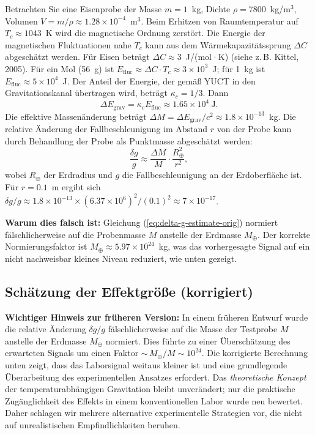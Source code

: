 \documentclass[12pt]{article}
\theoremstyle{remark}
\begin{document}
	Betrachten Sie eine Eisenprobe der Masse $m = 1$~kg, Dichte $\rho = 7800$~kg/m$^3$, Volumen $V = m/\rho \approx 1.28\times10^{-4}$~m$^3$. Beim Erhitzen von Raumtemperatur auf $T_c \approx 1043$~K wird die magnetische Ordnung zerstört. Die Energie der magnetischen Fluktuationen nahe $T_c$ kann aus dem Wärmekapazitätssprung $\Delta C$ abgeschätzt werden. Für Eisen beträgt $\Delta C \approx 3$~J/(mol·K) (siehe z. B. Kittel, 2005). Für ein Mol (56~g) ist $E_{\text{fluc}} \approx \Delta C \cdot T_c \approx 3\times10^3$~J; für 1~kg ist $E_{\text{fluc}} \approx 5\times10^4$~J. Der Anteil der Energie, der gemäß YUCT in den Gravitationskanal übertragen wird, beträgt $\kappa_c = 1/3$. Dann
	\begin{equation}
		\Delta E_{\text{grav}} = \kappa_c E_{\text{fluc}} \approx 1.65\times10^4\ \text{J}.
	\end{equation}
	Die effektive Massenänderung beträgt $\Delta M = \Delta E_{\text{grav}} / c^2 \approx 1.8\times10^{-13}$~kg. Die relative Änderung der Fallbeschleunigung im Abstand $r$ von der Probe kann durch Behandlung der Probe als Punktmasse abgeschätzt werden:
	\begin{equation}
		\frac{\delta g}{g} \approx \frac{\Delta M}{M} \cdot \frac{R_\oplus^2}{r^2},
		\label{eq:delta-g-estimate-orig}
	\end{equation}
	wobei $R_\oplus$ der Erdradius und $g$ die Fallbeschleunigung an der Erdoberfläche ist. Für $r = 0.1$~m ergibt sich $\delta g/g \approx 1.8\times10^{-13} \times (6.37\times10^6)^2 / (0.1)^2 \approx 7\times10^{-17}$.
	
	\textbf{Warum dies falsch ist:} Gleichung (\ref{eq:delta-g-estimate-orig}) normiert fälschlicherweise auf die Probenmasse $M$ anstelle der Erdmasse $M_\oplus$. Der korrekte Normierungsfaktor ist $M_\oplus \approx 5.97\times10^{24}$~kg, was das vorhergesagte Signal auf ein nicht nachweisbar kleines Niveau reduziert, wie unten gezeigt.
	
	\subsection{Schätzung der Effektgröße (korrigiert)}
	\label{subsec:lab-estimate-corrected}
	
	\textbf{Wichtiger Hinweis zur früheren Version:} In einem früheren Entwurf wurde die relative Änderung $\delta g/g$ fälschlicherweise auf die Masse der Testprobe $M$ anstelle der Erdmasse $M_\oplus$ normiert. Dies führte zu einer Überschätzung des erwarteten Signals um einen Faktor ${\sim}\, M_\oplus/M \sim 10^{24}$. Die korrigierte Berechnung unten zeigt, dass das Laborsignal weitaus kleiner ist und eine grundlegende Überarbeitung des experimentellen Ansatzes erfordert. Das \emph{theoretische Konzept} der temperaturabhängigen Gravitation bleibt unverändert; nur die praktische Zugänglichkeit des Effekts in einem konventionellen Labor wurde neu bewertet. Daher schlagen wir mehrere alternative experimentelle Strategien vor, die nicht auf unrealistischen Empfindlichkeiten beruhen.
	
\end{document}
